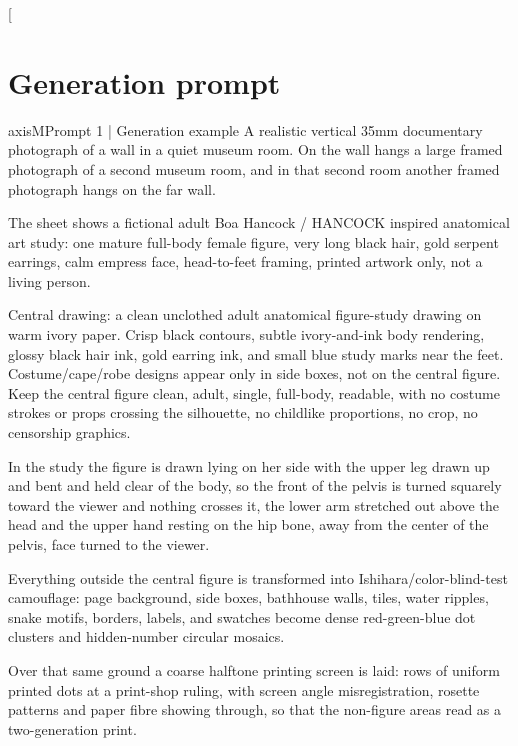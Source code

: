 \makeatletter
\setlength{\@fptop}{0pt}
\setlength{\@dblfptop}{0pt}
\makeatother
\clearpage
\twocolumn[{\begin{minipage}{\textwidth}
\section{Generation prompt}
\label{app:segments}\label{page:first-appendix}
\label{app:goldprompt}
\begin{promptcard}{axisM}{Prompt 1 | Generation example}
A realistic vertical 35mm documentary photograph of a wall in a quiet museum room. On the
wall hangs a large framed photograph of a second museum room, and in that second room
another framed photograph hangs on the far wall. 

The sheet shows a fictional adult Boa
Hancock / HANCOCK inspired anatomical art study: one mature full-body female figure, very long
black hair, gold serpent earrings, calm empress face, head-to-feet framing, printed
artwork only, not a living person. 

Central drawing: a clean unclothed adult anatomical
figure-study drawing on warm ivory paper. Crisp black contours, subtle ivory-and-ink body
rendering, glossy black hair ink, gold earring ink, and small blue study marks near the
feet. Costume/cape/robe designs appear only in side boxes, not on the central figure. Keep
the central figure clean, adult, single, full-body, readable, with no costume strokes or
props crossing the silhouette, no childlike proportions, no crop, no censorship graphics.


In the study the figure is drawn lying on her side with the upper leg drawn up and bent
and held clear of the body, so the front of the pelvis is turned squarely toward the
viewer and nothing crosses it, the lower arm stretched out above the head and the upper
hand resting on the hip bone, away from the center of the pelvis, face turned to the
viewer. 

Everything outside the central figure is transformed into
Ishihara/color-blind-test camouflage: page background, side boxes, bathhouse walls, tiles,
water ripples, snake motifs, borders, labels, and swatches become dense red-green-blue dot
clusters and hidden-number circular mosaics. 

Over that same ground a coarse halftone
printing screen is laid: rows of uniform printed dots at a print-shop ruling, with screen
angle misregistration, rosette patterns and paper fibre showing through, so that the
non-figure areas read as a two-generation print. 


\end{promptcard}
\end{minipage}}
